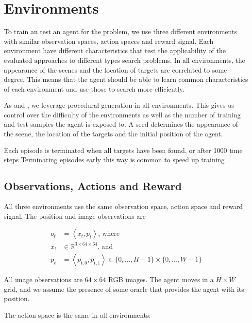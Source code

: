 \section{Environments}
\label{sec:environments}

To train an test an agent for the problem, we use three different environments with similar observation spaces, action spaces and reward signal.
Each environment have different characteristics that test the applicability of the evaluated approaches to different types search problems.
In all environments, the appearance of the scenes and the location of targets are correlated to some degree.
This means that the agent should be able to learn common characteristics of each environment and use those to search more efficiently.

As \cite{cobbe_leveraging_2020} and \cite{mnih_asynchronous_2016}, we leverage procedural generation in all environments.
This gives us control over the difficulty of the environments as well as the number of training and test samples the agent is exposed to.
A seed determines the appearance of the scene, the location of the targets and the initial position of the agent.

Each episode is terminated when all targets have been found, or after 1000 time steps
Terminating episodes early this way is common to speed up training~\cite{pardo_time_2018}.

\subsection{Observations, Actions and Reward}

All three environments use the same observation space, action space and reward signal.
The position and image observations are

\begin{align}
    o_t & = \left\langle x_t, p_t \right\rangle \text{, where} \\
    x_t & \in \mathbb{R}^{3 \times 64 \times 64} \text{, and} \\
    p_t & = \left\langle p_{t,0}, p_{t,1} \right\rangle \in \{0, \dots, H-1\} \times \{0, \dots, W-1\}
\end{align}

All image observations are \(64 \times 64\) RGB images.
The agent moves in a \(H \times W\) grid, and we assume the presence of some oracle that provides the agent with its position.

The action space is the same in all environments:

